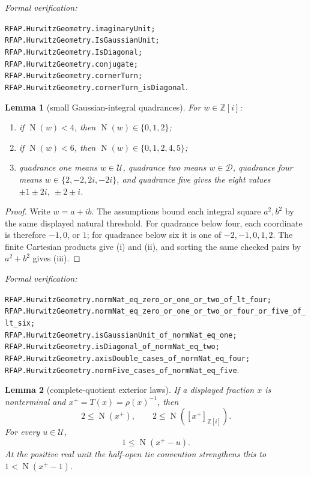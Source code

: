 \documentclass[11pt]{article}
\newtheorem{lemma}[lemma]{Lemma}
\newcommand{\Zi}{\mathbb{Z}[i]}
\newcommand{\Norm}[1]{\operatorname{N}\!\left(#1\right)}
\newcommand{\leanref}[1]{\par\smallskip\noindent
  \emph{Formal verification:}\par\nobreak
  {\raggedright\nolinkurl{#1}.\par}}
\begin{document}
\leanref{RFAP.HurwitzGeometry.imaginaryUnit;
RFAP.HurwitzGeometry.IsGaussianUnit;
RFAP.HurwitzGeometry.IsDiagonal;
RFAP.HurwitzGeometry.conjugate;
RFAP.HurwitzGeometry.cornerTurn;
RFAP.HurwitzGeometry.cornerTurn_isDiagonal}

\begin{lemma}[small Gaussian-integral quadrances]
\label{lem:small-gaussian-quadrances}
For $w\in\Zi$:
\begin{enumerate}[label=(\roman*)]
\item if $\Norm w<4$, then $\Norm w\in\{0,1,2\}$;
\item if $\Norm w<6$, then $\Norm w\in\{0,1,2,4,5\}$;
\item quadrance one means $w\in\mathcal U$, quadrance two means
$w\in\mathcal D$, quadrance four means $w\in\{2,-2,2i,-2i\}$, and
quadrance five gives the eight values $\pm1\pm2i,\ \pm2\pm i$.
\end{enumerate}
\end{lemma}

\begin{proof}
Write $w=a+ib$.  The assumptions bound each integral square $a^2,b^2$ by
the same displayed natural threshold.  For quadrance below four, each
coordinate is therefore $-1,0$, or $1$; for quadrance below six it is one of
$-2,-1,0,1,2$.  The finite Cartesian products give (i) and (ii), and sorting
the same checked pairs by $a^2+b^2$ gives (iii).
\end{proof}

\leanref{RFAP.HurwitzGeometry.normNat_eq_zero_or_one_or_two_of_lt_four;
RFAP.HurwitzGeometry.normNat_eq_zero_or_one_or_two_or_four_or_five_of_lt_six;
RFAP.HurwitzGeometry.isGaussianUnit_of_normNat_eq_one;
RFAP.HurwitzGeometry.isDiagonal_of_normNat_eq_two;
RFAP.HurwitzGeometry.axisDouble_cases_of_normNat_eq_four;
RFAP.HurwitzGeometry.normFive_cases_of_normNat_eq_five}

\begin{lemma}[complete-quotient exterior laws]
\label{lem:complete-quotient-exterior}
If a displayed fraction $x$ is nonterminal and $x^+=T(x)=\rho(x)^{-1}$,
then
\begin{equation}
\label{eq:complete-quotient-size}
                     2\le\Norm{x^+},
 \qquad
                     2\le\Norm{[x^+]_{\Zi}}.
\end{equation}
For every $u\in\mathcal U$,
\begin{equation}
\label{eq:unit-exterior}
                       1\le\Norm{x^+-u}.
\end{equation}
At the positive real unit the half-open tie convention strengthens this to
$1<\Norm{x^+-1}$.
\end{lemma}
\end{document}
